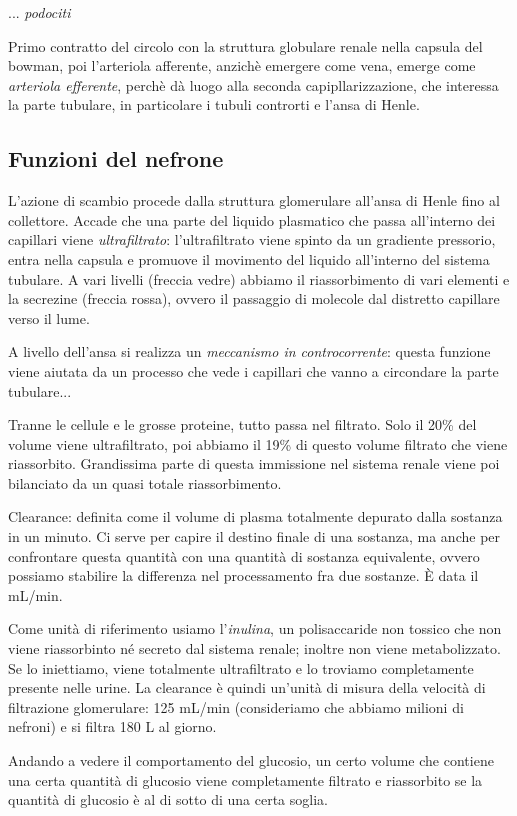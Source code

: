 \documentclass[a4paper,12pt]{article}
\begin{document}
... \emph{podociti}


 Primo contratto del circolo con la struttura globulare renale nella capsula del bowman, poi l'arteriola afferente, anzichè emergere come vena, emerge come \emph{arteriola efferente}, perchè dà luogo alla seconda capipllarizzazione, che interessa la parte tubulare, in particolare i tubuli controrti e l'ansa di Henle.
 
\subsection{Funzioni del nefrone}
L'azione di scambio procede dalla struttura glomerulare all'ansa di Henle fino al collettore. Accade che una parte del liquido plasmatico che passa all'interno dei capillari viene \emph{ultrafiltrato}: l'ultrafiltrato viene spinto da un gradiente pressorio, entra nella capsula e promuove il movimento del liquido all'interno del sistema tubulare. A vari livelli (freccia vedre) abbiamo il riassorbimento di vari elementi e la secrezine (freccia rossa), ovvero il passaggio di molecole dal distretto capillare verso il lume.

A livello dell'ansa si realizza un \emph{meccanismo in controcorrente}:  questa funzione viene aiutata da un processo che vede i capillari che vanno a circondare la parte tubulare...

Tranne le cellule e le grosse proteine, tutto passa nel filtrato. Solo il 20\% del volume viene ultrafiltrato, poi abbiamo il 19\% di questo volume filtrato che viene riassorbito. Grandissima parte di questa immissione nel sistema renale viene poi bilanciato da un quasi totale riassorbimento.

Clearance: definita come il volume di plasma totalmente depurato dalla sostanza in un minuto. Ci serve per capire il destino finale di una sostanza, ma anche per confrontare questa quantità con una quantità di sostanza equivalente, ovvero possiamo stabilire la differenza nel processamento fra due sostanze. È data il mL/min.

Come unità di riferimento usiamo l'\emph{inulina}, un polisaccaride non tossico che non viene riassorbinto né secreto dal sistema renale; inoltre non viene metabolizzato. Se lo iniettiamo, viene totalmente ultrafiltrato e lo troviamo completamente presente nelle urine. La clearance è quindi un'unità di misura della velocità di filtrazione glomerulare: 125 mL/min (consideriamo che abbiamo milioni di nefroni) e si filtra 180 L al giorno.

Andando a vedere il comportamento del glucosio, un certo volume che contiene una certa quantità di glucosio viene completamente filtrato e riassorbito se la quantità di glucosio è al di sotto di una certa soglia.
 
 
 
 
\end{document}
